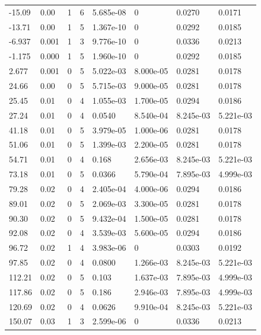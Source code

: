 \documentclass[preview]{standalone}
\begin{document}
{{\begin{tabular}{L{1.2cm}C{1.2cm} C{0.3cm}C{0.5cm} C{1.4cm}C{1.4cm} C{1.4cm}C{1.4cm}}
  -15.09  &  0.00  & 1     &  6 &  5.685e-08  & 0  & 0.0270 &  0.0171   \\ 
  -13.71  &  0.00  & 1     &  5 &  1.367e-10  & 0  & 0.0292 &  0.0185   \\ 
  -6.937  &  0.001  & 1     &  3 &  9.776e-10  & 0  & 0.0336 &  0.0213   \\ 
  -1.175  &  0.000  & 1     &  5 &  1.960e-10  & 0  & 0.0292 &  0.0185   \\ 
  2.677  &  0.001  & 0     &  5 &  5.022e-03  & 8.000e-05  & 0.0281 &  0.0178   \\ 
  24.66  &  0.00  & 0     &  5 &  5.715e-03  & 9.000e-05  & 0.0281 &  0.0178   \\ 
  25.45  &  0.01  & 0     &  4 &  1.055e-03  & 1.700e-05  & 0.0294 &  0.0186   \\ 
  27.24  &  0.01  & 0     &  4 &  0.0540  & 8.540e-04  & 8.245e-03 &  5.221e-03   \\ 
  41.18  &  0.01  & 0     &  5 &  3.979e-05  & 1.000e-06  & 0.0281 &  0.0178   \\ 
  51.06  &  0.01  & 0     &  5 &  1.399e-03  & 2.200e-05  & 0.0281 &  0.0178   \\ 
  54.71  &  0.01  & 0     &  4 &  0.168  & 2.656e-03  & 8.245e-03 &  5.221e-03   \\ 
  73.18  &  0.01  & 0     &  5 &  0.0366  & 5.790e-04  & 7.895e-03 &  4.999e-03   \\ 
  79.28  &  0.02  & 0     &  4 &  2.405e-04  & 4.000e-06  & 0.0294 &  0.0186   \\ 
  89.01  &  0.02  & 0     &  5 &  2.069e-03  & 3.300e-05  & 0.0281 &  0.0178   \\ 
  90.30  &  0.02  & 0     &  5 &  9.432e-04  & 1.500e-05  & 0.0281 &  0.0178   \\ 
  92.08  &  0.02  & 0     &  4 &  3.539e-03  & 5.600e-05  & 0.0294 &  0.0186   \\ 
  96.72  &  0.02  & 1     &  4 &  3.983e-06  & 0  & 0.0303 &  0.0192   \\ 
  97.85  &  0.02  & 0     &  4 &  0.0800  & 1.266e-03  & 8.245e-03 &  5.221e-03   \\ 
  112.21  &  0.02  & 0     &  5 &  0.103  & 1.637e-03  & 7.895e-03 &  4.999e-03   \\ 
  117.86  &  0.02  & 0     &  5 &  0.186  & 2.946e-03  & 7.895e-03 &  4.999e-03   \\ 
  120.69  &  0.02  & 0     &  4 &  0.0626  & 9.910e-04  & 8.245e-03 &  5.221e-03   \\ 
  150.07  &  0.03  & 1     &  3 &  2.599e-06  & 0  & 0.0336 &  0.0213   \\ 

\end{tabular}}}
\end{document}
